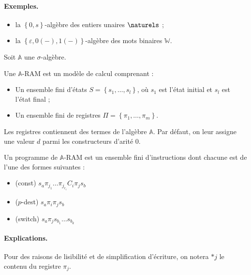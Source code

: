 \documentclass{article}
\newcommand{\bbA}{\mathbb{A}}
\begin{document}
		
		\paragraph{Exemples.}
		\begin{itemize}
			\setlength{\itemsep}{-1mm}
			\item 	la $\left\lbrace 0, s \right\rbrace$-algèbre des entiers unaires $\naturels$ ;
			\item 	la $\left\lbrace \varepsilon, 0(-), 1(-)\right\rbrace$-algèbre des mots binaires $\mathbb{W}$.
		\end{itemize}
		
		\espace
		
		Soit $\bbA$ une $\sigma$-algèbre. 
		
		\begin{definition}
			Une $\bbA$-RAM est un modèle de calcul comprenant :
			
			\begin{itemize}
				\setlength{\itemsep}{-1mm}
				\item 	Un ensemble fini d'états $S = \left\lbrace s_1, \dots, s_l \right\rbrace$, où $s_1$ est l'état initial et $s_l$ est l'état final ;
				\item 	Un ensemble fini de registres $\Pi = \left\lbrace \pi_1, \dots, \pi_m \right\rbrace$.
			\end{itemize}
			
			Les registres contiennent des termes de l'algèbre $\bbA$. Par défaut, on leur assigne une valeur $d$ parmi les constructeurs d'arité $0$. 
			
			Un programme de $\bbA$-RAM est un ensemble fini d'instructions dont chacune est de l'une des formes suivantes :
			
			\begin{itemize}
				\setlength{\itemsep}{-1mm}
				\item 	(const)			$s_a \pi_{j_1} \dots \pi_{j_{r_i}} C_i \pi_j s_b$
				\item	($p$-dest)		$s_a \pi_i \pi_j s_b$
				\item	(switch)		$s_a \pi_j s_{b_1} \dots s_{b_k}$
			\end{itemize}
			
			
			\paragraph{Explications.}
			Pour des raisons de lisibilité et de simplification d'écriture, on notera $*j$ le contenu du registre $\pi_j$. 
			

\end{definition}
\end{document}
